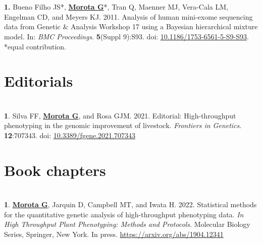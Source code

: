 \documentclass[margin,line,10pt]{res}
\newenvironment{list1}{
  \begin{list}{\ding{113}}{%
      \setlength{\itemsep}{0in}
      \setlength{\parsep}{0in} \setlength{\parskip}{0in}
      \setlength{\topsep}{0in} \setlength{\partopsep}{0in} 
      \setlength{\leftmargin}{0.17in}}}{\end{list}}
\begin{document}
\begin{resume}
\section{}
\begin{list1}
\item [\bf{1}.] Bueno Filho JS*, {\bf \underline{Morota G}}*, Tran Q, Maenner MJ, Vera-Cala LM, Engelman CD, and Meyers KJ. 2011. Analysis of human mini-exome sequencing data from Genetic \& Analysis Workshop 17 using a  Bayesian hierarchical mixture model. In: \emph{BMC Proceedings}. {\bf 5}(Suppl 9):S93. doi: \textcolor{blue}{\href{http://dx.doi.org/10.1186/1753-6561-5-S9-S93}{10.1186/1753-6561-5-S9-S93}}. *equal contribution.   
\end{list1}




\vspace{1.0cm}
\section{\sc Editorials}
\vspace{1.0cm}

\section{}
\begin{list1}
\item [{\bf 1}.]  Silva FF, {\bf \underline{Morota G}}, and Rosa GJM. 2021. Editorial: High-throughput phenotyping in the genomic improvement of livestock. \emph{Frontiers in Genetics}. \textbf{12}:707343. doi: \textcolor{blue}{\href{https://doi.org/10.3389/fgene.2021.707343}{10.3389/fgene.2021.707343}}
\end{list1}


\vspace{1.0cm}
\section{\sc Book chapters}
\vspace{1.0cm}

\section{}
\begin{list1}

\item  [{\bf 1}.] \textbf{\underline{Morota G}}, Jarquin D, Campbell MT, and Iwata H. 2022. Statistical methods for the quantitative genetic analysis of high-throughput phenotyping data. \emph{In High Throughput Plant Phenotyping: Methods and Protocols}. Molecular Biology Series, Springer, New York. In press.  \textcolor{blue}{\href{https://arxiv.org/abs/1904.12341}{https://arxiv.org/abs/1904.12341}}


\end{list1}
\end{resume}
\end{document}
